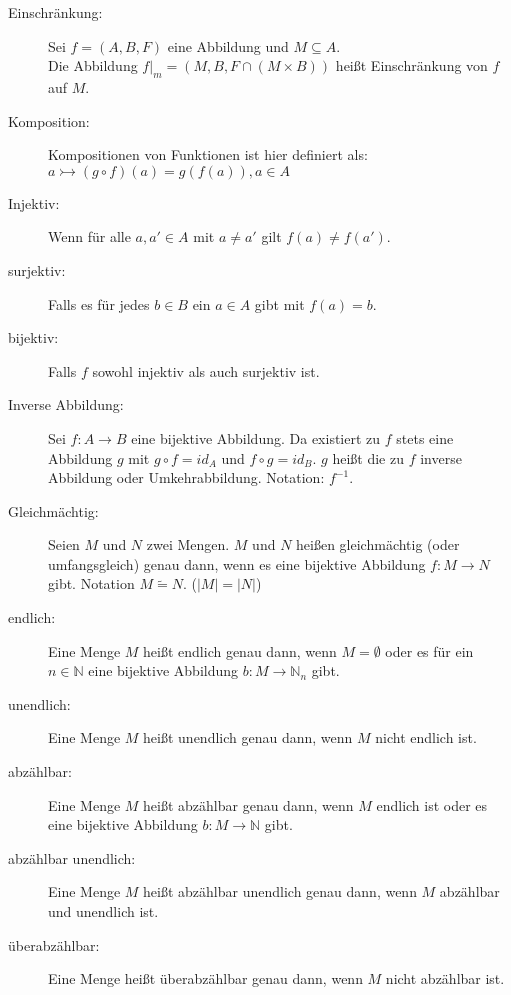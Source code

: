 \begin{description}
  \item [Einschränkung:]
    Sei $f = (A,B,F)$ eine Abbildung und $M \subseteq A$.\\
    Die Abbildung $f|_m = (M,B,F \cap (M \times B))$ heißt Einschränkung von
    $f$ auf $M$.

  \item [Komposition:]
    Kompositionen von Funktionen ist hier definiert als: 
    $a \rightarrowtail (g \circ f)(a) = g(f(a)), a \in A$

  \item [Injektiv:]
    Wenn für alle $a,a' \in A$ mit $a \neq a'$ gilt $f(a) \neq f(a')$.

  \item [surjektiv:]
    Falls es für jedes $b \in B$ ein $a \in A$ gibt mit $f(a) = b$.

  \item [bijektiv:]
    Falls $f$ sowohl injektiv als auch surjektiv ist.

  \item [Inverse Abbildung:]
    Sei $f : A \rightarrow B$ eine bijektive Abbildung. Da existiert zu $f$ 
    stets eine Abbildung $g$ mit $g \circ f = id_A$ und $f \circ g = id_B$.
    $g$ heißt die zu $f$ inverse Abbildung oder Umkehrabbildung. Notation: 
    $f^{-1}$.

  \item [Gleichmächtig:]
    Seien $M$ und $N$ zwei Mengen. $M$ und $N$ heißen gleichmächtig 
    (oder umfangsgleich) genau dann, wenn es eine bijektive Abbildung 
    $f : M \rightarrow N$ gibt. Notation $M \tilde{=} N$. ($|M| = |N|$)

  \item [endlich:]
    Eine Menge $M$ heißt endlich genau dann, wenn $M = \emptyset$ oder es für
    ein $n \in \mathbb{N}$ eine bijektive Abbildung
    $b : M \rightarrow \mathbb{N}_n$ gibt.

  \item [unendlich:]
    Eine Menge $M$ heißt unendlich genau dann, wenn $M$ nicht endlich ist.

  \item [abzählbar:]
    Eine Menge $M$ heißt abzählbar genau dann, wenn $M$ endlich ist oder es eine 
    bijektive Abbildung $b : M \rightarrow \mathbb{N}$ gibt.

  \item [abzählbar unendlich:]
    Eine Menge $M$ heißt abzählbar unendlich genau dann, wenn $M$ abzählbar und
    unendlich ist.

  \item [überabzählbar:]
    Eine Menge heißt überabzählbar genau dann, wenn $M$ nicht abzählbar ist.


\end{description}
